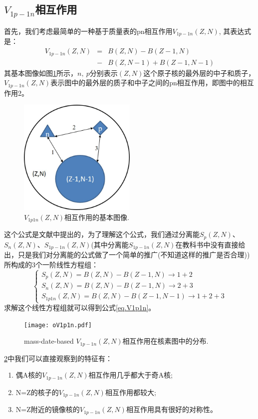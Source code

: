 \subsection{$V_{1p-1n}$相互作用}
首先，我们考虑最简单的一种基于质量表的pn相互作用$V_{1p-1n}(Z,N)$, 其表达式是：
\begin{eqnarray}
  V_{1p-1n}(Z,N)&=&B(Z,N)-B(Z-1,N)\nonumber\\ 
&-&B(Z,N-1)+B(Z-1,N-1) \label{eq.V1p1n}
\end{eqnarray}
其基本图像如图\ref{picV1p1n}所示，$n,\ p$分别表示$(Z,N)$这个原子核的最外层的中子和质子，$V_{1p-1n}(Z,N)$表示图中的最外层的质子和中子之间的pn相互作用，即图中的相互作用2。
\begin{figure}[H]
\centering
\includegraphics[width=0.5\textwidth]{figure/picV1p1n.jpg}
\caption{$V_{1p1n}(Z,N)$相互作用的基本图像.\label{picV1p1n}}
\end{figure}
这个公式是文献中提出的，为了理解这个公式，我们通过分离能$S_{p}(Z,N)$、$S_{n}(Z,N)$、$S_{1p-1n}(Z,N)$(其中分离能$S_{1p-1n}(Z,N)$在教科书中没有直接给出，只是我们对分离能的公式做了一个简单的推广(不知道这样的推广是否合理))所构成的3个一阶线性方程组：
\begin{displaymath}
\left\{ \begin{array}{l}
S_p(Z,N)=B(Z,N)-B(Z-1,N)\to1+2\\
S_n(Z,N)=B(Z,N)-B(Z-1,N)\to2+3\\
S_{1p1n}(Z,N)=B(Z,N)-B(Z-1,N-1)\to1+2+3
\end{array} \right.
\end{displaymath}
求解这个线性方程组就可以得到公式\ref{eq.V1p1n}。
\begin{figure}[H]
\centering
\texttt{[image: oV1p1n.pdf]}
\caption{mass-date-based $V_{1p-1n}(Z,N)$相互作用在核素图中的分布.\label{fig_oV1p1n}}
\end{figure}
\ref{fig_oV1p1n}中我们可以直接观察到的特征有：
\begin{enumerate}
  \item 偶A核的$V_{1p-1n}(Z,N)$相互作用几乎都大于奇A核;
  \item N=Z的核子的$V_{1p-1n}(Z,N)$相互作用都较大;
  \item N=Z附近的镜像核的$V_{1p-1n}(Z,N)$相互作用具有很好的对称性。
\end{enumerate}
